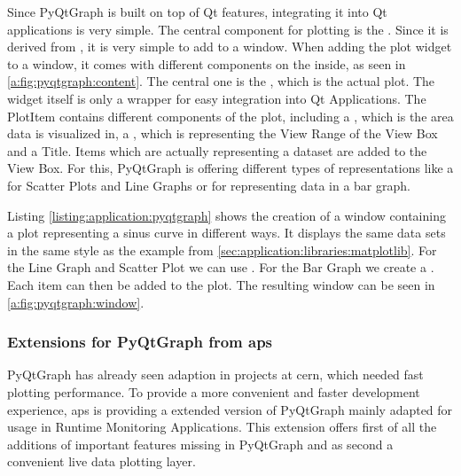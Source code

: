 Since PyQtGraph is built on top of Qt features, integrating it into Qt
applications is very simple. The central component for plotting is the
. Since it is derived from
, it is very simple to add to a window.
When adding the plot widget to a window, it comes with different components on
the inside, as seen in \ref{a:fig:pyqtgraph:content}. The central one is the
, which is the actual plot. The widget
itself is only a wrapper for easy integration into Qt Applications. The PlotItem
contains different components of the plot, including a
, which is the area data is visualized in,
a , which is representing the View Range
of the View Box and a Title. Items which are actually representing a dataset are
added to the View Box. For this, PyQtGraph is offering different types of
representations like a  for Scatter
Plots and Line Graphs or  for
representing data in a bar graph.

Listing \ref{listing:application:pyqtgraph} shows the creation of a window
containing a plot representing a sinus curve in different ways. It displays the
same data sets in the same style as the example from
\ref{sec:application:libraries:matplotlib}. For the Line Graph and Scatter Plot
we can use . For the Bar Graph we
create a . Each item can then be
added to the plot. The resulting window can be seen in
\ref{a:fig:pyqtgraph:window}.  \cite{PyQtGraphDoc}



\subsubsection{Extensions for PyQtGraph from \gls{aps}}
\label{sec:application:libraries:accpyqtgraph} PyQtGraph has already seen
adaption in projects at \gls{cern}, which needed fast plotting performance. To
provide a more convenient and faster development experience, \gls{aps} is
providing a extended version of PyQtGraph mainly adapted for usage in Runtime
Monitoring Applications. This extension offers first of all the additions of
important features missing in PyQtGraph and as second a convenient live data
plotting layer.

